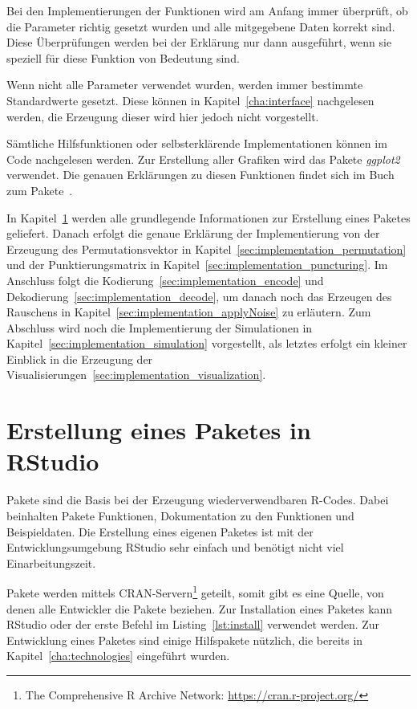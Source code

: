 Bei den Implementierungen der Funktionen wird am Anfang immer überprüft, ob die Parameter richtig gesetzt wurden und alle mitgegebene Daten korrekt sind. Diese Überprüfungen werden bei der Erklärung nur dann ausgeführt, wenn sie speziell für diese Funktion von Bedeutung sind. 

Wenn nicht alle Parameter verwendet wurden, werden immer bestimmte Standardwerte gesetzt. Diese können in Kapitel~\ref{cha:interface} nachgelesen werden, die Erzeugung dieser wird hier jedoch nicht vorgestellt.

Sämtliche Hilfsfunktionen oder selbsterklärende Implementationen können im Code nachgelesen werden. Zur Erstellung aller Grafiken wird das Pakete \emph{ggplot2} verwendet. Die genauen Erklärungen zu diesen Funktionen findet sich im Buch zum Pakete~\cite{ggplot2}.

In Kapitel~\ref{sec:implementation_package} werden alle grundlegende Informationen zur Erstellung eines Paketes geliefert. Danach erfolgt die genaue Erklärung der Implementierung von der Erzeugung des Permutationsvektor in Kapitel~\ref{sec:implementation_permutation} und der Punktierungsmatrix in Kapitel~\ref{sec:implementation_puncturing}. Im Anschluss folgt die Kodierung~\ref{sec:implementation_encode} und Dekodierung~\ref{sec:implementation_decode}, um danach noch das Erzeugen des Rauschens in Kapitel~\ref{sec:implementation_applyNoise} zu erläutern. Zum Abschluss wird noch die Implementierung der Simulationen in Kapitel~\ref{sec:implementation_simulation} vorgestellt, als letztes erfolgt ein kleiner Einblick in die Erzeugung der Visualisierungen~\ref{sec:implementation_visualization}.

\section{Erstellung eines Paketes in RStudio}
\label{sec:implementation_package}
Pakete sind die Basis bei der Erzeugung wiederverwendbaren R-Codes. Dabei beinhalten Pakete Funktionen, Dokumentation zu den Funktionen und Beispieldaten. Die Erstellung eines eigenen Paketes ist mit der Entwicklungsumgebung RStudio sehr einfach und benötigt nicht viel Einarbeitungszeit.

Pakete werden mittels CRAN-Servern\footnote{The Comprehensive R Archive Network: \url{https://cran.r-project.org/}} geteilt, somit gibt es eine Quelle, von denen alle Entwickler die Pakete beziehen. Zur Installation eines Paketes kann RStudio oder der erste Befehl im Listing~\ref{lst:install} verwendet werden. Zur Entwicklung eines Paketes sind einige Hilfspakete nützlich, die bereits in Kapitel~\ref{cha:technologies} eingeführt wurden. 

